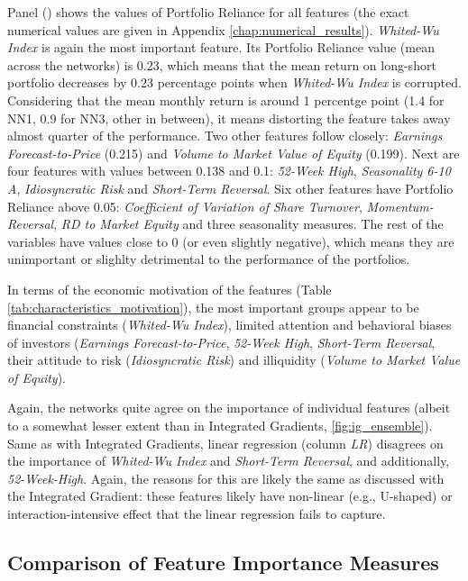 		Panel () shows the values of Portfolio Reliance for all features (the exact numerical values are given in Appendix \ref{chap:numerical_results}). \textit{Whited-Wu Index} is again the most important feature. Its Portfolio Reliance value (mean across the networks) is 0.23, which means that the mean return on long-short portfolio decreases by 0.23 percentage points when \textit{Whited-Wu Index} is corrupted. Considering that the mean monthly return is around 1 percentge point (1.4 for NN1, 0.9 for NN3, other in between), it means distorting the feature takes away almost quarter of the performance. Two other features follow closely: \textit{ Earnings Forecast-to-Price} (0.215) and \textit{Volume to Market Value of Equity} (0.199). Next are four features with values between 0.138 and 0.1: \textit{52-Week High}, \textit{Seasonality 6-10 A}, \textit{Idiosyncratic Risk} and \textit{Short-Term Reversal}. Six other features have Portfolio Reliance above 0.05: \textit{Coefficient of Variation of Share Turnover}, \textit{Momentum-Reversal}, \textit{RD to Market Equity} and three seasonality measures. The rest of the variables have values close to 0 (or even slightly negative), which means they are unimportant or slighlty detrimental to the performance of the portfolios. 
		
		In terms of the economic motivation of the features (Table \ref{tab:characteristics_motivation}), the most important groups appear to be financial constraints (\textit{Whited-Wu Index}), limited attention and behavioral biases of investors (\textit{Earnings Forecast-to-Price}, \textit{52-Week High}, \textit{Short-Term Reversal}, their attitude to risk (\textit{Idiosyncratic Risk}) and illiquidity (\textit{Volume to Market Value of Equity}).  
		
		Again, the networks quite agree on the importance of individual features (albeit to a somewhat lesser extent than in Integrated Gradients, \ref{fig:ig_ensemble}). Same as with Integrated Gradients, linear regression (column \textit{LR}) disagrees on the importance of \textit{Whited-Wu Index} and \textit{Short-Term Reversal}, and additionally, \textit{52-Week-High}. Again, the reasons for this are likely the same as discussed with the Integrated Gradient: these features likely have non-linear (e.g., U-shaped) or interaction-intensive effect that the linear regression fails to capture.    
		
	\subsection{Comparison of Feature Importance Measures} 	

